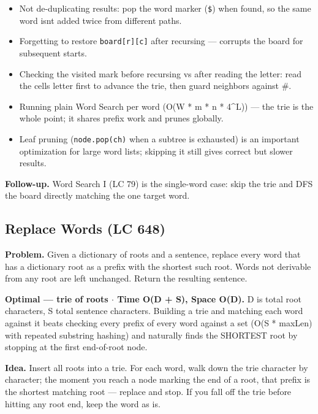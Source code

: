 \documentclass[11pt]{article}
\providecommand{\tightlist}{\setlength{\itemsep}{1pt}\setlength{\parskip}{0pt}}
\begin{document}
\begin{itemize}
\tightlist
\item
  Not de-duplicating results: pop the word marker (\texttt{\textquotesingle{}\$\textquotesingle{}}) when found, so the same word isn\textquotesingle t added twice from different paths.
\item
  Forgetting to restore \texttt{board{[}r{]}{[}c{]}} after recursing --- corrupts the board for subsequent starts.
\item
  Checking the visited mark before recursing vs after reading the letter: read the cell\textquotesingle s letter first to advance the trie, then guard neighbors against \textquotesingle\#\textquotesingle.
\item
  Running plain Word Search per word (O(W * m * n * 4\^{}L)) --- the trie is the whole point; it shares prefix work and prunes globally.
\item
  Leaf pruning (\texttt{node.pop(ch)} when a subtree is exhausted) is an important optimization for large word lists; skipping it still gives correct but slower results.
\end{itemize}

\textbf{Follow-up.} Word Search I (LC 79) is the single-word case: skip the trie and DFS the board directly matching the one target word.

\subsection{Replace Words (LC 648)}\label{replace-words-lc-648}

\textbf{Problem.} Given a dictionary of roots and a sentence, replace every word that has a dictionary root as a prefix with the shortest such root. Words not derivable from any root are left unchanged. Return the resulting sentence.

\textbf{Optimal --- trie of roots \(\cdot\) Time O(D + S), Space O(D).} D is total root characters, S total sentence characters. Building a trie and matching each word against it beats checking every prefix of every word against a set (O(S * maxLen) with repeated substring hashing) and naturally finds the SHORTEST root by stopping at the first end-of-root node.

\textbf{Idea.} Insert all roots into a trie. For each word, walk down the trie character by character; the moment you reach a node marking the end of a root, that prefix is the shortest matching root --- replace and stop. If you fall off the trie before hitting any root end, keep the word as is.
\end{document}
